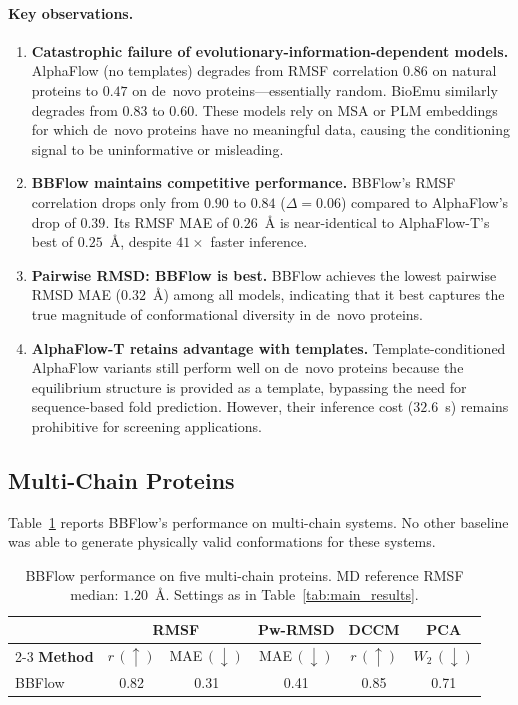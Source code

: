 \documentclass[12pt,a4paper]{article}
\begin{document}
\paragraph{Key observations.}
\begin{enumerate}
  \item \textbf{Catastrophic failure of evolutionary-information-dependent models.}
    AlphaFlow (no templates) degrades from RMSF correlation $0.86$ on natural proteins to
    $0.47$ on de~novo proteins---essentially random.  BioEmu similarly degrades from $0.83$
    to $0.60$.  These models rely on MSA or PLM embeddings for which de~novo proteins have
    no meaningful data, causing the conditioning signal to be uninformative or misleading.

  \item \textbf{BBFlow maintains competitive performance.}
    BBFlow's RMSF correlation drops only from $0.90$ to $0.84$ ($\Delta = 0.06$) compared to
    AlphaFlow's drop of $0.39$.  Its RMSF MAE of $0.26$~Å is near-identical to
    AlphaFlow-T's best of $0.25$~Å, despite $41\times$ faster inference.

  \item \textbf{Pairwise RMSD: BBFlow is best.}
    BBFlow achieves the lowest pairwise RMSD MAE ($0.32$~Å) among all models, indicating
    that it best captures the true magnitude of conformational diversity in de~novo proteins.

  \item \textbf{AlphaFlow-T retains advantage with templates.}
    Template-conditioned AlphaFlow variants still perform well on de~novo proteins because
    the equilibrium structure is provided as a template, bypassing the need for sequence-based
    fold prediction.  However, their inference cost ($32.6$~s) remains prohibitive for
    screening applications.
\end{enumerate}

\subsection{Multi-Chain Proteins}
\label{sec:multichain_results}

Table~\ref{tab:multichain_results} reports BBFlow's performance on multi-chain systems.
No other baseline was able to generate physically valid conformations for these systems.

\begin{table}[h]
  \centering
  \caption{BBFlow performance on five multi-chain proteins.
    MD reference RMSF median: $1.20$~Å.  Settings as in Table~\ref{tab:main_results}.}
  \label{tab:multichain_results}
  \begin{tabular}{lccccc}
    \toprule
    & \multicolumn{2}{c}{\textbf{RMSF}} & \textbf{Pw-RMSD} & \textbf{DCCM} & \textbf{PCA} \\
    \cmidrule(lr){2-3}
    \textbf{Method} & $r\,(\uparrow)$ & MAE$\,(\downarrow)$ & MAE$\,(\downarrow)$
      & $r\,(\uparrow)$ & $W_2\,(\downarrow)$ \\
    \midrule
    BBFlow & 0.82 & 0.31 & 0.41 & 0.85 & 0.71 \\
    \bottomrule
  \end{tabular}
\end{table}
\end{document}
